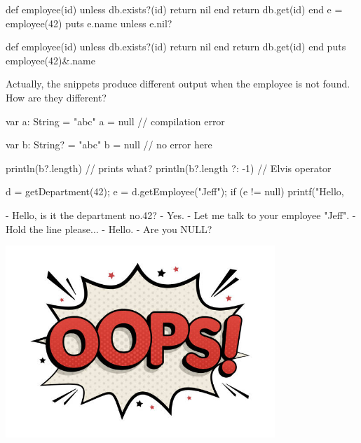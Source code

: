 \documentclass{article}
\begin{document}
\begin{pptWide}{2}
{\small\begin{ffcode}
def employee(id)
  unless db.exists?(id)
    return nil
  end
  return db.get(id)
end
e = employee(42)
puts e.name unless e.nil?
\end{ffcode}
}
\par\columnbreak\par
{\small\begin{ffcode}
def employee(id)
  unless db.exists?(id)
    return nil
  end
  return db.get(id)
end
puts employee(42)&.name
\end{ffcode}
}
\end{pptWide}
\par
Actually, the snippets produce different output when the employee is not found. How are they different?
\plush{}

{\small\begin{ffcode}
var a: String = "abc"
a = null // compilation error

var b: String? = "abc"
b = null // no error here

println(b?.length) // prints what?
println(b?.length ?: -1) // Elvis operator
\end{ffcode}
}
\plush{}


\begin{pptWide}{2}
{\small\begin{ffcode}
d = getDepartment(42);
e = d.getEmployee("Jeff");
if (e != null) {
  printf("Hello, %
}
\end{ffcode}
}
\par\columnbreak\par
{\small\begin{ffcode}
- Hello, is it the department no.42?
- Yes.
- Let me talk to your employee "Jeff".
- Hold the line please...
- Hello.
- Are you NULL?
\end{ffcode}
}
\includegraphics[width=4in]{oops.jpg}
\end{pptWide}
\par
\plush{}
\end{document}
